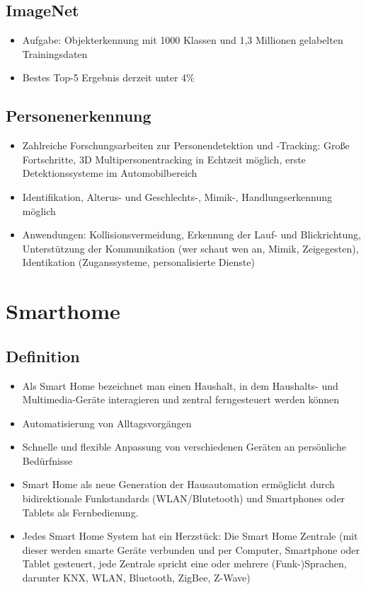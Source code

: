 \documentclass[paper=a4, fontsize=11pt]{scrartcl} %
\numberwithin{equation}{section} %
\numberwithin{figure}{section} %
\numberwithin{table}{section} %
\begin{document}
\subsection{ImageNet}

\begin{itemize}
\item Aufgabe: Objekterkennung mit 1000 Klassen und 1,3 Millionen gelabelten Trainingsdaten
\item Bestes Top-5 Ergebnis derzeit unter 4\%
\end{itemize}

\subsection{Personenerkennung}

\begin{itemize}
\item Zahlreiche Forschungsarbeiten zur Personendetektion und -Tracking: Große Fortschritte, 3D Multipersonentracking in Echtzeit möglich, erste Detektionssysteme im Automobilbereich
\item Identifikation, Alterus- und Geschlechts-, Mimik-, Handlungserkennung möglich
\item Anwendungen: Kollisionsvermeidung, Erkennung der Lauf- und Blickrichtung, Unterstützung der Kommunikation (wer schaut wen an, Mimik, Zeigegesten), Identikation (Zuganssysteme, personalisierte Dienste)
\end{itemize}

\section{Smarthome}

\subsection{Definition}

\begin{itemize}
\item Als Smart Home bezeichnet man einen Haushalt, in dem Haushalts- und Multimedia-Geräte interagieren und zentral ferngesteuert werden können
\item Automatisierung von Alltagsvorgängen
\item Schnelle und flexible Anpassung von verschiedenen Geräten an persönliche Bedürfnisse
\item Smart Home als neue Generation der Hausautomation ermöglicht durch bidirektionale Funkstandards (WLAN/Blutetooth) und Smartphones oder Tablets als Fernbedienung.
\item Jedes Smart Home System hat ein Herzstück: Die Smart Home Zentrale (mit dieser werden smarte Geräte verbunden und per Computer, Smartphone oder Tablet gesteuert, jede Zentrale spricht eine oder mehrere (Funk-)Sprachen, darunter KNX, WLAN, Bluetooth, ZigBee, Z-Wave)
\end{itemize}
\end{document}
